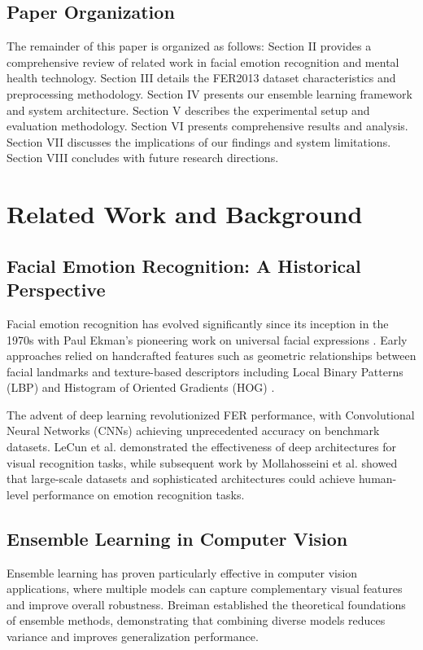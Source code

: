 \documentclass[conference]{IEEEtran}
\begin{document}
\subsection{Paper Organization}
The remainder of this paper is organized as follows: Section II provides a comprehensive review of related work in facial emotion recognition and mental health technology. Section III details the FER2013 dataset characteristics and preprocessing methodology. Section IV presents our ensemble learning framework and system architecture. Section V describes the experimental setup and evaluation methodology. Section VI presents comprehensive results and analysis. Section VII discusses the implications of our findings and system limitations. Section VIII concludes with future research directions.

\section{Related Work and Background}

\subsection{Facial Emotion Recognition: A Historical Perspective}
Facial emotion recognition has evolved significantly since its inception in the 1970s with Paul Ekman's pioneering work on universal facial expressions \cite{ekman1971constants}. Early approaches relied on handcrafted features such as geometric relationships between facial landmarks and texture-based descriptors including Local Binary Patterns (LBP) and Histogram of Oriented Gradients (HOG) \cite{shan2009facial}.

The advent of deep learning revolutionized FER performance, with Convolutional Neural Networks (CNNs) achieving unprecedented accuracy on benchmark datasets. LeCun et al. \cite{lecun2015deep} demonstrated the effectiveness of deep architectures for visual recognition tasks, while subsequent work by Mollahosseini et al. \cite{mollahosseini2017affectnet} showed that large-scale datasets and sophisticated architectures could achieve human-level performance on emotion recognition tasks.

\subsection{Ensemble Learning in Computer Vision}
Ensemble learning has proven particularly effective in computer vision applications, where multiple models can capture complementary visual features and improve overall robustness. Breiman \cite{breiman2001random} established the theoretical foundations of ensemble methods, demonstrating that combining diverse models reduces variance and improves generalization performance.
\end{document}
